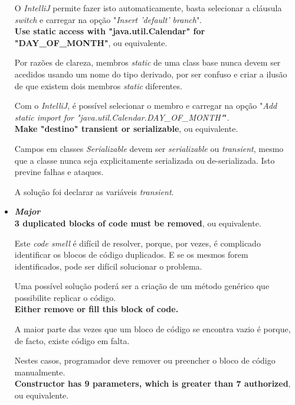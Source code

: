 \documentclass[a4paper]{report}
\begin{document}
\begin{itemize}
    O \textit{IntelliJ} permite fazer isto automaticamente, basta selecionar a cláusula \textit{switch} e carregar na opção "\textit{Insert 'default' branch}".\\
    
    \textbf{Use static access with "java.util.Calendar" for "DAY\_OF\_MONTH"}, ou equivalente.

    Por razões de clareza, membros \textit{static} de uma class base nunca devem ser acedidos usando um nome do tipo derivado, por ser confuso e criar a ilusão de que existem dois membros \textit{static} diferentes.
    
    Com o \textit{IntelliJ}, é possível selecionar o membro e carregar na opção "\textit{Add static import for "java.util.Calendar.DAY\_OF\_MONTH"}".\\

    \textbf{Make "destino" transient or serializable}, ou equivalente.

    Campos em classes \textit{Serializable} devem ser \textit{serializable} ou \textit{transient}, mesmo que a classe nunca seja explicitamente serializada ou de-serializada.
    Isto previne falhas e ataques.
    
    A solução foi declarar as variáveis \textit{transient}. \\


    \item \textit{\textbf{Major}}\\
    \textbf{3 duplicated blocks of code must be removed}, ou equivalente. 
    
    Este \textit{code smell} é difícil de resolver, porque, por vezes, é complicado identificar os blocos de código duplicados.
    E se os mesmos forem identificados, pode ser difícil solucionar o problema.
    
    Uma possível solução poderá ser a criação de um método genérico que possibilite replicar o código. \\
    
    \textbf{Either remove or fill this block of code.}
    
    A maior parte das vezes que um bloco de código se encontra vazio é porque, de facto, existe código em falta.
    
    Nestes casos, programador deve remover ou preencher o bloco de código manualmente.\\
    
    
    \textbf{Constructor has 9 parameters, which is greater than 7 authorized}, ou equivalente.
    

\end{itemize}
\end{document}
